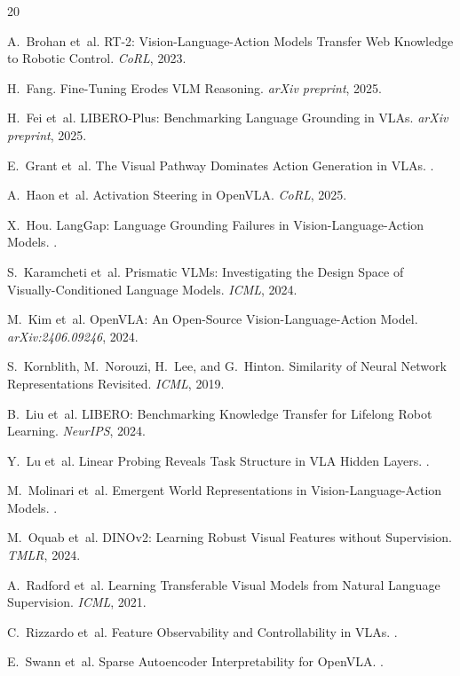 \documentclass[letterpaper]{article}
\begin{document}
\begin{thebibliography}{20}

A.~Brohan et~al.
\newblock RT-2: Vision-Language-Action Models Transfer Web Knowledge to Robotic Control.
\newblock \emph{CoRL}, 2023.

H.~Fang.
\newblock Fine-Tuning Erodes VLM Reasoning.
\newblock \emph{arXiv preprint}, 2025.

H.~Fei et~al.
\newblock LIBERO-Plus: Benchmarking Language Grounding in VLAs.
\newblock \emph{arXiv preprint}, 2025.

E.~Grant et~al.
\newblock The Visual Pathway Dominates Action Generation in VLAs.
.

A.~Haon et~al.
\newblock Activation Steering in OpenVLA.
\newblock \emph{CoRL}, 2025.

X.~Hou.
\newblock LangGap: Language Grounding Failures in Vision-Language-Action Models.
.

S.~Karamcheti et~al.
\newblock Prismatic VLMs: Investigating the Design Space of Visually-Conditioned Language Models.
\newblock \emph{ICML}, 2024.

M.~Kim et~al.
\newblock OpenVLA: An Open-Source Vision-Language-Action Model.
\newblock \emph{arXiv:2406.09246}, 2024.

S.~Kornblith, M.~Norouzi, H.~Lee, and G.~Hinton.
\newblock Similarity of Neural Network Representations Revisited.
\newblock \emph{ICML}, 2019.

B.~Liu et~al.
\newblock LIBERO: Benchmarking Knowledge Transfer for Lifelong Robot Learning.
\newblock \emph{NeurIPS}, 2024.

Y.~Lu et~al.
\newblock Linear Probing Reveals Task Structure in VLA Hidden Layers.
.

M.~Molinari et~al.
\newblock Emergent World Representations in Vision-Language-Action Models.
.

M.~Oquab et~al.
\newblock DINOv2: Learning Robust Visual Features without Supervision.
\newblock \emph{TMLR}, 2024.

A.~Radford et~al.
\newblock Learning Transferable Visual Models from Natural Language Supervision.
\newblock \emph{ICML}, 2021.

C.~Rizzardo et~al.
\newblock Feature Observability and Controllability in VLAs.
.

E.~Swann et~al.
\newblock Sparse Autoencoder Interpretability for OpenVLA.
.

\end{thebibliography}
\end{document}
